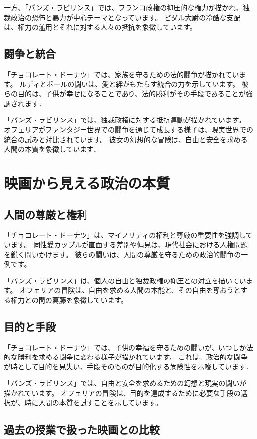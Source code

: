 \documentclass[titlepage,a4paper]{jsarticle}
\begin{document}
一方、「パンズ・ラビリンス」では、フランコ政権の抑圧的な権力が描かれ、独裁政治の恐怖と暴力が中心テーマとなっています。
ビダル大尉の冷酷な支配は、権力の濫用とそれに対する人々の抵抗を象徴しています。
\subsection{闘争と統合}
「チョコレート・ドーナツ」では、家族を守るための法的闘争が描かれています。
ルディとポールの闘いは、愛と絆がもたらす統合の力を示しています。
彼らの目的は、子供が幸せになることであり、法的勝利がその手段であることが強調されます．

「パンズ・ラビリンス」では、独裁政権に対する抵抗運動が描かれています。
オフェリアがファンタジー世界での闘争を通じて成長する様子は、現実世界での統合の試みと対比されています。
彼女の幻想的な冒険は、自由と安全を求める人間の本質を象徴しています．
\section{映画から見える政治の本質}
\subsection{人間の尊厳と権利}
「チョコレート・ドーナツ」は、マイノリティの権利と尊厳の重要性を強調しています。
同性愛カップルが直面する差別や偏見は、現代社会における人権問題を鋭く問いかけます。
彼らの闘いは、人間の尊厳を守るための政治的闘争の一例です。

「パンズ・ラビリンス」は、個人の自由と独裁政権の抑圧との対立を描いています。
オフェリアの冒険は、自由を求める人間の本能と、その自由を奪おうとする権力との間の葛藤を象徴しています。

\subsection{目的と手段}
「チョコレート・ドーナツ」では、子供の幸福を守るための闘いが、いつしか法的な勝利を求める闘争に変わる様子が描かれています。
これは、政治的な闘争が時として目的を見失い、手段そのものが目的化する危険性を示唆しています．

「パンズ・ラビリンス」では、自由と安全を求めるための幻想と現実の闘いが描かれています。
オフェリアの冒険は、目的を達成するために必要な手段の選択が、時に人間の本質を試すことを示しています。

\subsection{過去の授業で扱った映画との比較}
\end{document}
